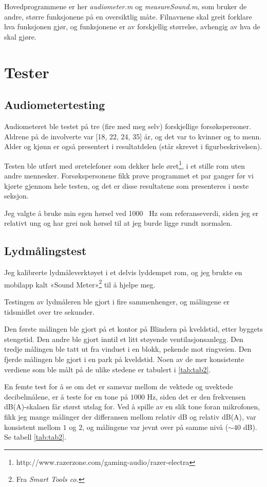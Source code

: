 \documentclass[norsk, twocolumn,letterpaper,11pt,fleqn]{extarticle}
\begin{document}
Hovedprogrammene er her \textit{audiometer.m} og \textit{measureSound.m},
som bruker de andre, større funksjonene på en oversiktlig måte.
Filnavnene skal greit forklare hva funksjonen gjør, og funksjonene
er av forskjellig størrelse, avhengig av hva de skal gjøre.

\section{Tester}
\label{sec:testing}
\subsection{Audiometertesting}
Audiometeret ble testet på tre (fire med meg selv) forskjellige forsøkspersoner. 
Aldrene på de involverte var [18, 22, 24, 35] år, 
og det var to kvinner og to menn.
Alder og kjønn er også presentert i resultatdelen (står skrevet i figurbeskrivelsen).

Testen ble utført med øretelefoner som 
dekker hele øret\footnote[6]{http://www.razerzone.com/gaming-audio/razer-electra},
i et stille rom uten andre mennesker. Forsøkspersonene fikk prøve programmet
et par ganger før vi kjørte gjennom hele testen, og det er disse resultatene som
presenteres i neste seksjon.

Jeg valgte å bruke min egen hørsel ved \num{1000} \SI{}{\Hz} som referanseverdi,
siden jeg er relativt ung og har grei nok hørsel til at jeg burde ligge rundt normalen.

\subsection{Lydmålingstest}
\label{sub:lydtest}
Jeg kalibrerte lydmåleverktøyet i et delvis lyddempet rom, og jeg brukte en mobilapp
kalt «Sound Meter»\footnote[7]{Fra \textit{Smart Tools co.}} til å hjelpe meg.

Testingen av lydmåleren ble gjort i fire sammenhenger, 
og målingene er tidsmidlet over tre sekunder.

Den første målingen ble gjort på et kontor på Blindern på kveldstid, 
etter byggets stengetid. Den andre ble gjort inntil et litt støyende ventilasjonsanlegg.
Den tredje målingen ble tatt ut fra vinduet i en blokk, pekende mot ringveien.
Den fjerde målingen ble gjort i en park på kveldstid.
Noen av de mer konsistente verdiene som ble målt på de ulike 
stedene er tabulert i \ref{tab:tab2}.

En femte test for å se om det er samsvar mellom de vektede og uvektede decibelmålene,
er å teste for en tone på $1000$ Hz, siden det er den frekvensen dB(A)-skalaen
får størst utslag for. Ved å spille av en slik tone foran mikrofonen, fikk
jeg mange målinger der differansen mellom relativ dB og relativ dB(A),
var konsistent mellom $1$ og $2$, og målingene var jevnt over på samme nivå ($\sim 40$ dB).
Se tabell \ref{tab:tab2}.
\end{document}
